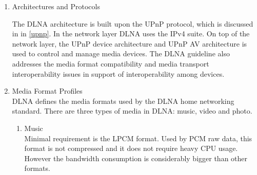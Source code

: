 \begin{enumerate} 
\item Architectures and Protocols 

\begin{table}[htb] 
\caption{Key Technology Ingredients \label{Table3}} 
\begin{center} 
\end{center} 
\end{table} 

The DLNA architecture is built upon the UPnP protocol, which is discussed in 
 in \ref{upnp}. 
In the network layer DLNA uses the IPv4 suite. On top of the network layer, the UPnP device architecture and UPnP AV architecture is used to control and manage media devices. The DLNA 
guideline also addresses the media format compatibility and media transport 
interoperability issues in support of interoperability among devices. 

\item Media Format Profiles \\ 
DLNA defines the media formats used by the DLNA home networking 
standard. There are three types of media in DLNA: music, video and photo. 
\begin{enumerate} 
\item Music \\ 
Minimal requirement is the LPCM format. Used by PCM raw data, this format is not compressed and it does not require heavy CPU usage. However the bandwidth consumption is 
considerably bigger than other formats. 


\end{enumerate}
\end{enumerate}
